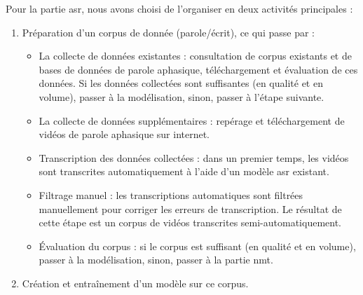 Pour la partie \gls{asr}, nous avons choisi de l'organiser en deux activités principales :
\begin{enumerate}[label=(\roman*)]
    \item Préparation d'un corpus de donnée (parole/écrit), ce qui passe par :
    \begin{itemize}
        \item La collecte de données existantes : 
        consultation de corpus existants et de bases de données de parole aphasique,
        téléchargement et évaluation de ces données.
        Si les données collectées sont suffisantes (en qualité et en volume), 
        passer à la modélisation, sinon, passer à l'étape suivante.
        \item La collecte de données supplémentaires :
        repérage et téléchargement de vidéos de parole aphasique sur internet.
        \item Transcription des données collectées :
        dans un premier temps, les vidéos sont transcrites automatiquement à l'aide d'un modèle \gls{asr} existant.
        \item Filtrage manuel :
        les transcriptions automatiques sont filtrées manuellement pour corriger les erreurs de transcription.
        Le résultat de cette étape est un corpus de vidéos transcrites semi-automatiquement.
        \item Évaluation du corpus :
        si le corpus est suffisant (en qualité et en volume), 
        passer à la modélisation, sinon, passer à la partie \gls{nmt}.
    \end{itemize}
    \item Création et entraînement d'un modèle sur ce corpus.
\end{enumerate}

